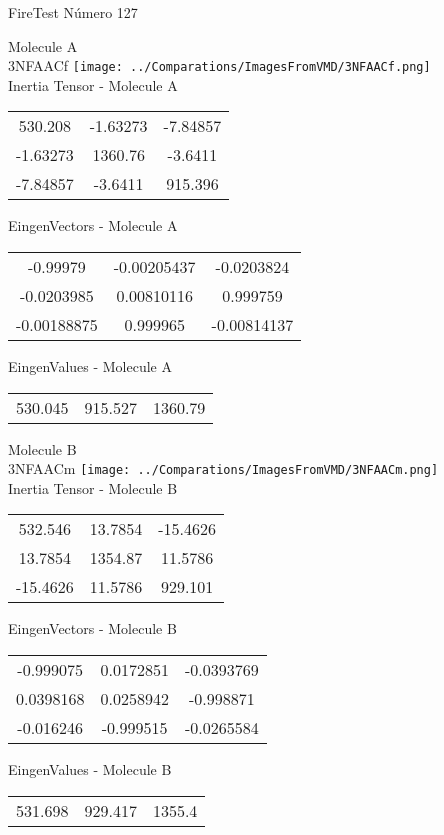 \vtab[-2cm]
\begin{center}
{\large FireTest \tab Número 127}
\end{center}
\begin{multicols}{2}
\begin{center}

Molecule A \\ 
3NFAACf
\texttt{[image: ../Comparations/ImagesFromVMD/3NFAACf.png]}
\\
Inertia Tensor - Molecule A \\
\vtab

\begin{tabular}{|c c c|}
530.208	 & 	-1.63273	 & 	-7.84857	 \\
-1.63273	 & 	1360.76	 & 	-3.6411	 \\
-7.84857	 & 	-3.6411	 & 	915.396
\end{tabular}

\vtab
 EingenVectors - Molecule A     \\
\vtab
\begin{tabular}{|c c c|}
-0.99979	 & 	-0.00205437	 & 	-0.0203824	 \\
-0.0203985	 & 	0.00810116	 & 	0.999759	 \\
-0.00188875	 & 	0.999965	 & 	-0.00814137
\end{tabular}

\vtab
 EingenValues - Molecule A     \\
\vtab
\begin{tabular}{|c c c|}
530.045	 & 	915.527	 & 	1360.79	 \\
\end{tabular}
\columnbreak

Molecule B \\ 
3NFAACm
\texttt{[image: ../Comparations/ImagesFromVMD/3NFAACm.png]}
\\
Inertia Tensor - Molecule B \\
\vtab

\begin{tabular}{|c c c|}
532.546	 & 	13.7854	 & 	-15.4626	 \\
13.7854	 & 	1354.87	 & 	11.5786	 \\
-15.4626	 & 	11.5786	 & 	929.101
\end{tabular}

\vtab
 EingenVectors - Molecule B     \\
\vtab
\begin{tabular}{|c c c|}
-0.999075	 & 	0.0172851	 & 	-0.0393769	 \\
0.0398168	 & 	0.0258942	 & 	-0.998871	 \\
-0.016246	 & 	-0.999515	 & 	-0.0265584
\end{tabular}

\vtab
 EingenValues - Molecule B     \\
\vtab
\begin{tabular}{|c c c|}
531.698	 & 	929.417	 & 	1355.4	 \\
\end{tabular}

\end{center}
\end{multicols}
